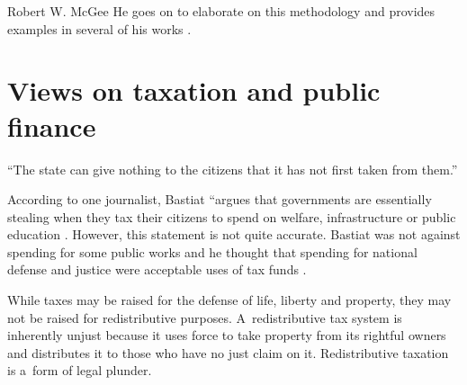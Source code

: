 \begin{artengenv}{Robert W. McGee}
He goes on to elaborate on this methodology and provides examples in several of his works 
\parencites[][]{bastiat_ce_1850}[][]{bastiat_harmonies_1870}[][]{bastiat_ce_1873}[][]{bastiat_sophismes_1873}[][]{bastiat_economic_1964}[][]{bastiat_economic_1964-1}[][]{bastiat_selected_1964}[][]{bastiat_bastiat_2007}.%




\section{Views on taxation and public finance}

\begin{flushright}
``The state can give nothing to the citizens that it has not first taken from them.'' 
\parencite[][p.183]{bastiat_selected_1964}%
\end{flushright}




According to one journalist, Bastiat ``argues that governments are essentially stealing when they tax their citizens to spend on welfare, infrastructure or public education 
\parencite[][]{zernike_shaping_2010}. %
 However, this statement is not quite accurate. Bastiat was not against spending for some public works 
\parencite[][p.46]{bastiat_economic_1964} %
 and he thought that spending for national defense and justice were acceptable uses of tax funds 
\parencite[][p.184]{bastiat_selected_1964}.%




While taxes may be raised for the defense of life, liberty and property, they may not be raised for redistributive purposes. A~redistributive tax system is inherently unjust because it uses force to take property from its rightful owners and distributes it to those who have no just claim on it. Redistributive taxation is a~form of legal plunder.




\end{artengenv}
